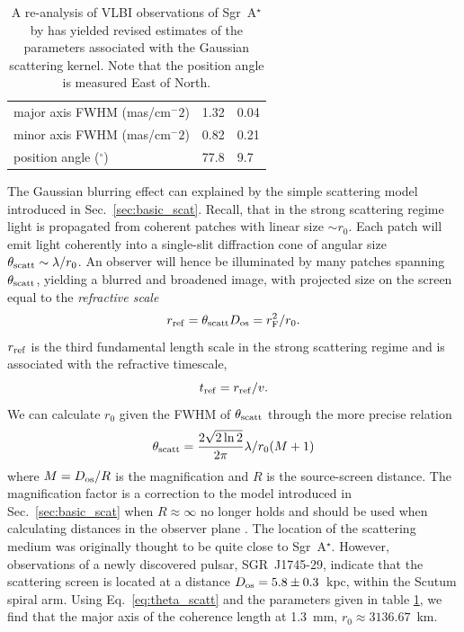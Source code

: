 \begin{table}[]
\centering
\caption{A re-analysis of VLBI observations of Sgr~A$^\star$ by \citet{Psaltis_2015} has yielded revised estimates of the parameters associated with the Gaussian scattering kernel. Note that the position angle is measured East of North. \label{tab:ism_gauss}}
\begin{tabular}{l|ll}
\hline
major axis FWHM (mas/cm$^-2$)& 1.32 & 0.04 \\
minor axis FWHM (mas/cm$^-2$)& 0.82 & 0.21 \\
position angle ($^\circ$)& 77.8 & 9.7\\  
\hline
\end{tabular}
\end{table}


The Gaussian blurring effect can explained by the simple scattering model introduced in  Sec.~\ref{sec:basic_scat}. Recall, that in the strong scattering regime light is propagated from coherent patches with linear size $\sim r_0$. Each patch will emit light coherently into a single-slit diffraction cone of angular size $\theta_{\rm scatt} \sim \lambda /r_0$. An observer will hence be illuminated by many patches spanning $\theta_{\rm scatt}$, yielding a blurred and broadened image, with projected size on the screen equal to the \emph{refractive scale} 
$$r_{\rm ref} = \theta_{\rm scatt} D_{\rm os} = r_{\rm F}^2/r_0.$$
$r_{\rm ref}$ is the third fundamental length scale in the strong scattering regime and is associated with the refractive timescale,
$$t_{\rm ref} = r_{\rm ref}/v.$$
We can calculate $r_0$ given the FWHM of $\theta_{\rm scatt}$ through the more precise relation
\begin{equation}\label{eq:theta_scatt}
 \theta_{\rm scatt} = \frac{2\sqrt{2\ln{2}}}{2\pi} \lambda / r_0 (M+1)
\end{equation} 
where $M = D_{\rm os}/R$ is the magnification and $R$ is the source-screen distance. The magnification factor is a correction to the model introduced in Sec.~\ref{sec:basic_scat} when $R \approx \infty$ no longer holds and should be used when calculating distances in the observer plane \citep*{Goodman_1989}.
The location of the scattering medium was originally thought to be quite close to Sgr~A$^\star$. However, observations of a newly discovered pulsar, SGR~J1745-29, indicate that the scattering screen is located at a distance $D_{\rm os} = 5.8 \pm 0.3$~kpc, within the Scutum spiral arm. Using Eq.~\ref{eq:theta_scatt} and the parameters given in table \ref{tab:ism_gauss}, we find that the major axis of the coherence length at 1.3~mm, $r_0 \approx 3136.67$~km.


